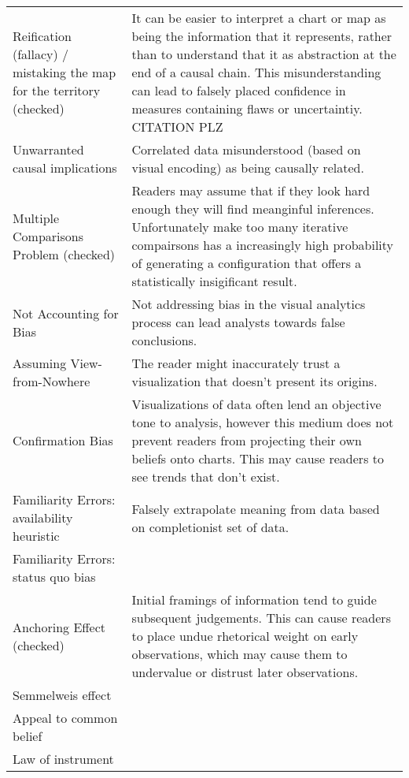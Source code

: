 \begin{longtable}{p{5cm}p{12cm}}
   \rowcolor{colord}Reification (fallacy) / mistaking the map for the territory (checked) & It can be easier to interpret a chart or map as being the information that it represents, rather than to understand that it as abstraction at the end of a causal chain. This misunderstanding can lead to falsely placed confidence in measures containing flaws or uncertaintiy.  CITATION PLZ\\
 \rowcolor{colord-opaque}Unwarranted causal implications & Correlated data misunderstood (based on visual encoding) as being causally related. \cite{xiong2019illusion, few2019loom}\\
 \rowcolor{colord}Multiple Comparisons Problem (checked) & Readers may assume that if they look hard enough they will find meanginful inferences. Unfortunately make too many iterative compairsons has a increasingly high probability of generating a configuration that offers a statistically insigificant result. \cite{pu2018garden, zgraggen2018investigating}\\
 \rowcolor{colord-opaque}Not Accounting for Bias & Not addressing bias in the visual analytics process can lead analysts towards false conclusions. \cite{wall2017warning}\\
 \rowcolor{colord}Assuming View-from-Nowhere & The reader might inaccurately trust a visualization that doesn't present its origins. \cite{dignazio2019draft, d2016feminist}\\
 \rowcolor{colord-opaque}Confirmation Bias & Visualizations of data often lend an objective tone to analysis, however this medium does not prevent readers from projecting their own beliefs onto charts. This may cause readers to see trends that don't exist. \cite{valdez2017framework, few2019loom}\\
 \rowcolor{colord}Familiarity Errors: availability heuristic & Falsely extrapolate meaning from data based on completionist set of data. \cite{few2019loom}\\
 \rowcolor{colord-opaque}Familiarity Errors: status quo bias &  \cite{few2019loom}\\
 \rowcolor{colord}Anchoring Effect (checked) & Initial framings of information tend to guide subsequent judgements. This can cause readers to place undue rhetorical weight on early observations, which may cause them to undervalue or distrust later observations.  \cite{ritchie2019lie, hullman2011visualization}\\
 \rowcolor{colord-opaque}Semmelweis effect &  \cite{valdez2017framework}\\
 \rowcolor{colord}Appeal to common belief &  \cite{few2019loom}\\
 \rowcolor{colord-opaque}Law of instrument &  \cite{few2019loom}\\
\end{longtable}
\label{table:mirage-table}
